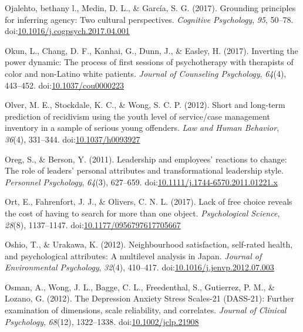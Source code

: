 \documentclass[english,man]{apa6}
\theoremstyle{definition}
\theoremstyle{definition}
\theoremstyle{definition}
\theoremstyle{remark}
\begin{document}
\hypertarget{ref-Ojalehto2017}{}
Ojalehto, bethany l., Medin, D. L., \& García, S. G. (2017). Grounding
principles for inferring agency: Two cultural perspectives.
\emph{Cognitive Psychology}, \emph{95}, 50--78.
doi:\href{https://doi.org/10.1016/j.cogpsych.2017.04.001}{10.1016/j.cogpsych.2017.04.001}

\hypertarget{ref-Okun2017}{}
Okun, L., Chang, D. F., Kanhai, G., Dunn, J., \& Easley, H. (2017).
Inverting the power dynamic: The process of first sessions of
psychotherapy with therapists of color and non-Latino white patients.
\emph{Journal of Counseling Psychology}, \emph{64}(4), 443--452.
doi:\href{https://doi.org/10.1037/cou0000223}{10.1037/cou0000223}

\hypertarget{ref-Olver2012}{}
Olver, M. E., Stockdale, K. C., \& Wong, S. C. P. (2012). Short and
long-term prediction of recidivism using the youth level of service/case
management inventory in a sample of serious young offenders. \emph{Law
and Human Behavior}, \emph{36}(4), 331--344.
doi:\href{https://doi.org/10.1037/h0093927}{10.1037/h0093927}

\hypertarget{ref-Oreg2011}{}
Oreg, S., \& Berson, Y. (2011). Leadership and employees' reactions to
change: The role of leaders' personal attributes and transformational
leadership style. \emph{Personnel Psychology}, \emph{64}(3), 627--659.
doi:\href{https://doi.org/10.1111/j.1744-6570.2011.01221.x}{10.1111/j.1744-6570.2011.01221.x}

\hypertarget{ref-Ort2017}{}
Ort, E., Fahrenfort, J. J., \& Olivers, C. N. L. (2017). Lack of free
choice reveals the cost of having to search for more than one object.
\emph{Psychological Science}, \emph{28}(8), 1137--1147.
doi:\href{https://doi.org/10.1177/0956797617705667}{10.1177/0956797617705667}

\hypertarget{ref-Oshio2012}{}
Oshio, T., \& Urakawa, K. (2012). Neighbourhood satisfaction, self-rated
health, and psychological attributes: A multilevel analysis in Japan.
\emph{Journal of Environmental Psychology}, \emph{32}(4), 410--417.
doi:\href{https://doi.org/10.1016/j.jenvp.2012.07.003}{10.1016/j.jenvp.2012.07.003}

\hypertarget{ref-Osman2012}{}
Osman, A., Wong, J. L., Bagge, C. L., Freedenthal, S., Gutierrez, P. M.,
\& Lozano, G. (2012). The Depression Anxiety Stress Scales-21 (DASS-21):
Further examination of dimensions, scale reliability, and correlates.
\emph{Journal of Clinical Psychology}, \emph{68}(12), 1322--1338.
doi:\href{https://doi.org/10.1002/jclp.21908}{10.1002/jclp.21908}
\end{document}
